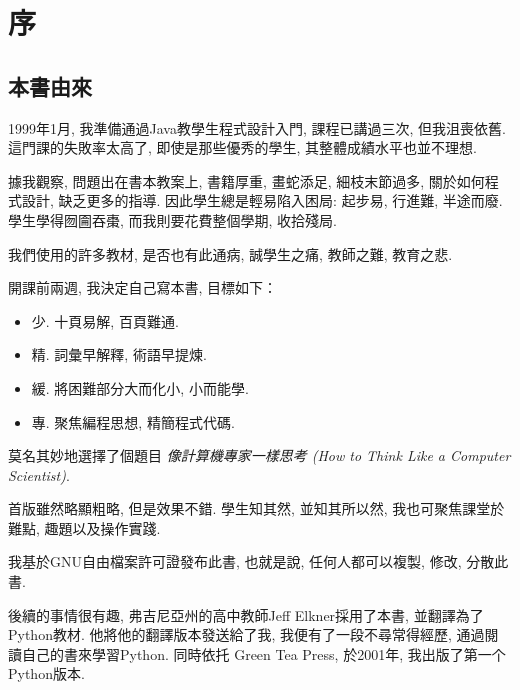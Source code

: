 \documentclass[10pt]{book}
\begin{document}
\fi

\chapter{序}

\section*{本書由來}

1999年1月, 我準備通過Java教學生程式設計入門, 
課程已講過三次, 但我沮喪依舊. 
這門課的失敗率太高了, 即使是那些優秀的學生, 
其整體成績水平也並不理想.

據我觀察, 問題出在書本教案上, 
書籍厚重, 畫蛇添足, 細枝末節過多, 關於如何程式設計, 缺乏更多的指導.
因此學生總是輕易陷入困局: 起步易, 行進難, 半途而廢.
學生學得囫圇吞棗, 而我則要花費整個學期, 收拾殘局.

\begin{note}
我們使用的許多教材, 是否也有此通病, 誠學生之痛, 教師之難, 教育之悲.
\end{note}


開課前兩週, 我決定自己寫本書, 目標如下：

\begin{itemize}

\item 少. 十頁易解, 百頁難通.

\item 精. 詞彙早解釋, 術語早提煉.

\item 緩. 將困難部分大而化小, 小而能學.

\item 專. 聚焦編程思想, 精簡程式代碼.

\end{itemize}

莫名其妙地選擇了個題目 {\em 像計算機專家一樣思考
(How to Think Like a Computer Scientist)}.

首版雖然略顯粗略, 但是效果不錯. 
學生知其然, 並知其所以然, 我也可聚焦課堂於難點, 趣題以及操作實踐. 

我基於GNU自由檔案許可證發布此書, 
也就是說, 任何人都可以複製, 修改, 分散此書. 

後續的事情很有趣, 弗吉尼亞州的高中教師Jeff Elkner採用了本書, 
並翻譯為了Python教材. 他將他的翻譯版本發送給了我, 
我便有了一段不尋常得經歷, 通過閱讀自己的書來學習Python.  
同時依托 Green Tea Press, 於2001年, 我出版了第一个Python版本. 
\end{document}
